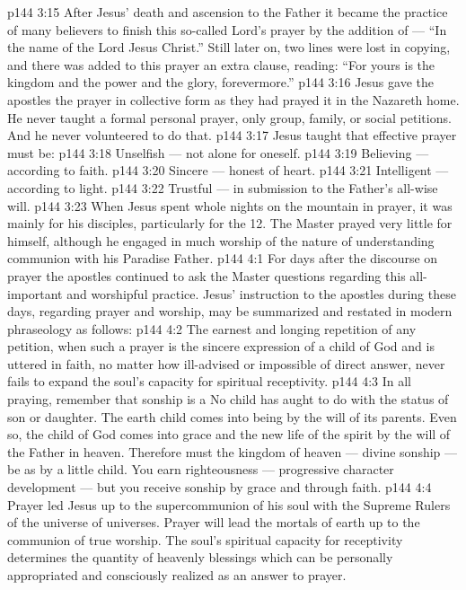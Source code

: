 \vs p144 3:15 After Jesus’ death and ascension to the Father it became the practice of many believers to finish this so\hyp{}called Lord’s prayer by the addition of --- “In the name of the Lord Jesus Christ.” Still later on, two lines were lost in copying, and there was added to this prayer an extra clause, reading: “For yours is the kingdom and the power and the glory, forevermore.”
\vs p144 3:16 Jesus gave the apostles the prayer in collective form as they had prayed it in the Nazareth home. He never taught a formal personal prayer, only group, family, or social petitions. And he never volunteered to do that.
\vs p144 3:17 Jesus taught that effective prayer must be:
\vs p144 3:18 \bibnobreakspace Unselfish --- not alone for oneself.
\vs p144 3:19 \bibnobreakspace Believing --- according to faith.
\vs p144 3:20 \bibnobreakspace Sincere --- honest of heart.
\vs p144 3:21 \bibnobreakspace Intelligent --- according to light.
\vs p144 3:22 \bibnobreakspace Trustful --- in submission to the Father’s all\hyp{}wise will.
\vs p144 3:23 \pc When Jesus spent whole nights on the mountain in prayer, it was mainly for his disciples, particularly for the 12. The Master prayed very little for himself, although he engaged in much worship of the nature of understanding communion with his Paradise Father.
\vs p144 4:1 For days after the discourse on prayer the apostles continued to ask the Master questions regarding this all\hyp{}important and worshipful practice. Jesus’ instruction to the apostles during these days, regarding prayer and worship, may be summarized and restated in modern phraseology as follows:
\vs p144 4:2 \pc The earnest and longing repetition of any petition, when such a prayer is the sincere expression of a child of God and is uttered in faith, no matter how ill\hyp{}advised or impossible of direct answer, never fails to expand the soul’s capacity for spiritual receptivity.
\vs p144 4:3 In all praying, remember that sonship is a  No child has aught to do with  the status of son or daughter. The earth child comes into being by the will of its parents. Even so, the child of God comes into grace and the new life of the spirit by the will of the Father in heaven. Therefore must the kingdom of heaven --- divine sonship --- be  as by a little child. You earn righteousness --- progressive character development --- but you receive sonship by grace and through faith.
\vs p144 4:4 Prayer led Jesus up to the supercommunion of his soul with the Supreme Rulers of the universe of universes. Prayer will lead the mortals of earth up to the communion of true worship. The soul’s spiritual capacity for receptivity determines the quantity of heavenly blessings which can be personally appropriated and consciously realized as an answer to prayer.
